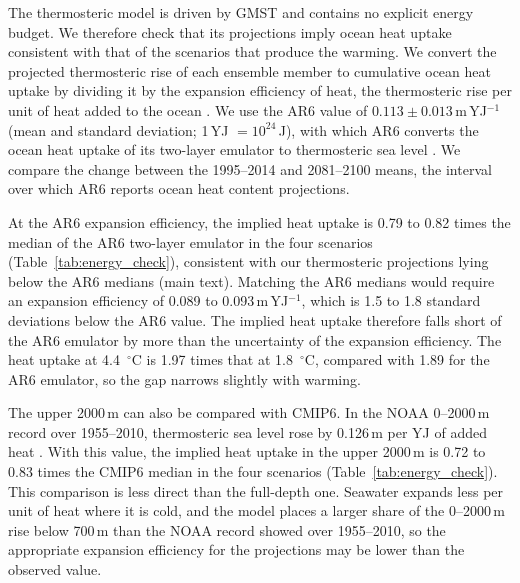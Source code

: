 \documentclass[12pt]{article}
\begin{document}
The thermosteric model is driven by GMST and contains no explicit energy budget. We therefore check that its projections imply ocean heat uptake consistent with that of the scenarios that produce the warming. We convert the projected thermosteric rise of each ensemble member to cumulative ocean heat uptake by dividing it by the expansion efficiency of heat, the thermosteric rise per unit of heat added to the ocean \citep{Kuhlbrodt2012}. We use the AR6 value of $0.113 \pm 0.013$\,m\,YJ$^{-1}$ (mean and standard deviation; 1\,YJ $= 10^{24}$\,J), with which AR6 converts the ocean heat uptake of its two-layer emulator to thermosteric sea level \citep{Fox-Kemper2021}. We compare the change between the 1995--2014 and 2081--2100 means, the interval over which AR6 reports ocean heat content projections.

At the AR6 expansion efficiency, the implied heat uptake is 0.79 to 0.82 times the median of the AR6 two-layer emulator in the four scenarios (Table~\ref{tab:energy_check}), consistent with our thermosteric projections lying below the AR6 medians (main text). Matching the AR6 medians would require an expansion efficiency of 0.089 to 0.093\,m\,YJ$^{-1}$, which is 1.5 to 1.8 standard deviations below the AR6 value. The implied heat uptake therefore falls short of the AR6 emulator by more than the uncertainty of the expansion efficiency. The heat uptake at 4.4~$^\circ$C is 1.97 times that at 1.8~$^\circ$C, compared with 1.89 for the AR6 emulator, so the gap narrows slightly with warming.

The upper 2000\,m can also be compared with CMIP6. In the NOAA 0--2000\,m record over 1955--2010, thermosteric sea level rose by 0.126\,m per YJ of added heat \citep{Levitus2012}. With this value, the implied heat uptake in the upper 2000\,m is 0.72 to 0.83 times the CMIP6 median in the four scenarios (Table~\ref{tab:energy_check}). This comparison is less direct than the full-depth one. Seawater expands less per unit of heat where it is cold, and the model places a larger share of the 0--2000\,m rise below 700\,m than the NOAA record showed over 1955--2010, so the appropriate expansion efficiency for the projections may be lower than the observed value.
\end{document}
